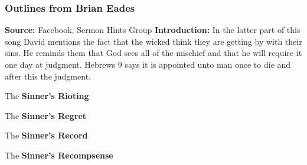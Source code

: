 \subsubsection{Outlines from Brian Eades}

\textbf{Source: } Facebook, Sermon Hints Group
\textbf{Introduction: }In the latter part of this song David mentions the fact that the wicked think they are getting by with their sins. He reminds them that God sees all of the mischief and that he will require it one day at judgment. Hebrews 9 says it is appointed unto man once to die and after this the judgment.
\begin{compactenum}[I.]
    \item The \textbf{Sinner's Rioting} 
    \item The \textbf{Sinner's Regret} 
    \item The \textbf{Sinner's Record} 
    \item The \textbf{Sinner's Recompsense} 
\end{compactenum}